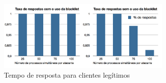 \begin{figure}[h!]
\centering
\includegraphics[width=0.76\textwidth]{images/blacklistTxResp.png}
\caption{Tempo de resposta para clientes legítimos}
\label{fig:blacklistTxResp}
\end{figure}
% 



